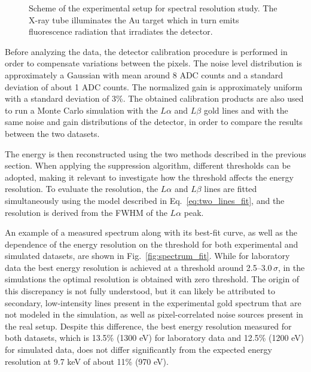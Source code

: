 \begin{figure}[htbp]
  \caption{Scheme of the experimental setup for spectral resolution study. The X-ray tube illuminates the Au target which in turn emits fluorescence radiation that irradiates the detector.}
  \label{fig:spectral_setup}
\end{figure}

Before analyzing the data, the detector calibration procedure is performed in order to compensate variations between the pixels. The noise level distribution is approximately a Gaussian with mean around 8 ADC counts and a standard deviation of about 1 ADC counts. The normalized gain is approximately uniform with a standard deviation of 3\%. The obtained calibration products are also used to run a Monte Carlo simulation with the $L\alpha$ and $L\beta$ gold lines and with the same noise and gain distributions of the detector, in order to compare the results between the two datasets.

The energy is then reconstructed using the two methods described in the previous section. When applying the suppression algorithm, different thresholds can be adopted, making it relevant to investigate how the threshold affects the energy resolution. To evaluate the resolution, the $L\alpha$ and $L\beta$ lines are fitted simultaneously using the model described in Eq.~\ref{eq:two_lines_fit}, and the resolution is derived from the FWHM of the $L\alpha$ peak. 

An example of a measured spectrum along with its best-fit curve, as well as the dependence of the energy resolution on the threshold for both experimental and simulated datasets, are shown in Fig.~\ref{fig:spectrum_fit}. While for laboratory data the best energy resolution is achieved at a threshold around 2.5--3.0\,$\sigma$, in the simulations the optimal resolution is obtained with zero threshold. The origin of this discrepancy is not fully understood, but it can likely be attributed to secondary, low-intensity lines present in the experimental gold spectrum that are not modeled in the simulation, as well as pixel-correlated noise sources present in the real setup. Despite this difference, the best energy resolution measured for both datasets, which is 13.5\% (1300 eV) for laboratory data and 12.5\% (1200 eV) for simulated data, does not differ significantly from the expected energy resolution at 9.7 keV of about 11\% (970 eV).


